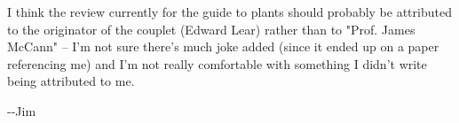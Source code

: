 \documentclass[12pt]{sigbovik-review}
\author{\textless ix@tchow.com\textgreater}
\begin{document}
\maketitle

I think the review currently for the guide to plants should probably be attributed to the originator of the couplet (Edward Lear) rather than to "Prof. James McCann" -- I'm not sure there's much joke added (since it ended up on a paper referencing me) and I'm not really comfortable with something I didn't write being attributed to me.

-{}-Jim
\end{document}

